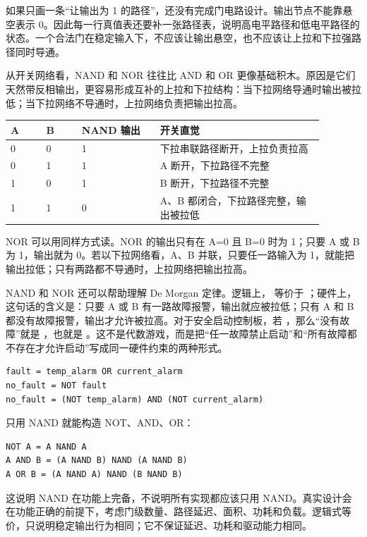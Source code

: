 如果只画一条“让输出为 1 的路径”，还没有完成门电路设计。输出节点不能靠悬空表示 0。因此每一行真值表还要补一张路径表，说明高电平路径和低电平路径的状态。一个合法门在稳定输入下，不应该让输出悬空，也不应该让上拉和下拉强路径同时导通。

从开关网络看，NAND 和 NOR 往往比 AND 和 OR 更像基础积木。原因是它们天然带反相输出，更容易形成互补的上拉和下拉结构：当下拉网络导通时输出被拉低；当下拉网络不导通时，上拉网络负责把输出拉高。

\begin{longtable}{L{0.1\linewidth}L{0.1\linewidth}L{0.22\linewidth}L{0.46\linewidth}}
\toprule
A & B & NAND 输出 & 开关直觉 \\
 & 0 & 1 & 下拉串联路径断开，上拉负责拉高 \\
0 & 1 & 1 & A 断开，下拉路径不完整 \\
1 & 0 & 1 & B 断开，下拉路径不完整 \\
1 & 1 & 0 & A、B 都闭合，下拉路径完整，输出被拉低 \\
\bottomrule
\end{longtable}

NOR 可以用同样方式读。NOR 的输出只有在 A=0 且 B=0 时为 1；只要 A 或 B 为 1，输出就为 0。若以下拉网络看，A、B 并联，只要任一路输入为 1，就能把输出拉低；只有两路都不导通时，上拉网络把输出拉高。

NAND 和 NOR 还可以帮助理解 De Morgan 定律。逻辑上， 等价于 ；硬件上，这句话的含义是：只要 A 或 B 有一路故障报警，输出就应被拉低；只有 A 和 B 都没有故障报警，输出才允许被拉高。对于安全启动控制板，若 ，那么“没有故障”就是 ，也就是 。这不是代数游戏，而是把“任一故障禁止启动”和“所有故障都不存在才允许启动”写成同一硬件约束的两种形式。

\begin{lstlisting}
fault = temp_alarm OR current_alarm
no_fault = NOT fault
no_fault = (NOT temp_alarm) AND (NOT current_alarm)
\end{lstlisting}

只用 NAND 就能构造 NOT、AND、OR：

\begin{lstlisting}
NOT A = A NAND A
A AND B = (A NAND B) NAND (A NAND B)
A OR B = (A NAND A) NAND (B NAND B)
\end{lstlisting}

这说明 NAND 在功能上完备，不说明所有实现都应该只用 NAND。真实设计会在功能正确的前提下，考虑门级数量、路径延迟、面积、功耗和负载。逻辑式等价，只说明稳定输出行为相同；它不保证延迟、功耗和驱动能力相同。

